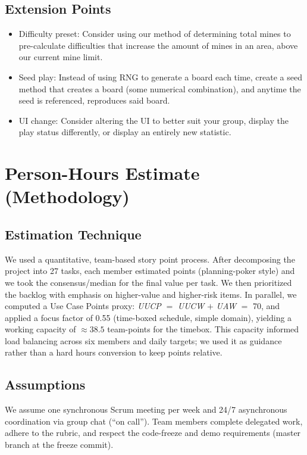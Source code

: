 \documentclass[11pt]{article}
\begin{document}
\subsection{Extension Points}
\begin{itemize}
    \item Difficulty preset: Consider using our method of determining total mines to pre-calculate difficulties that increase the amount of mines in an area, above our current mine limit.
    \item Seed play: Instead of using RNG to generate a board each time, create a seed method that creates a board (some numerical combination), and anytime the seed is referenced, reproduces said board.
    \item UI change: Consider altering the UI to better suit your group, display the play status differently, or display an entirely new statistic.
\end{itemize}

\section{Person-Hours Estimate (Methodology)}
\subsection{Estimation Technique}
We used a quantitative, team-based story point process. After decomposing the project into 27 tasks, each member estimated points (planning-poker style) and we took the consensus/median for the final value per task. We then prioritized the backlog with emphasis on higher-value and higher-risk items. In parallel, we computed a Use Case Points proxy: \textit{UUCP} \(=\) \textit{UUCW} \(+\) \textit{UAW} \(=\) 70, and applied a focus factor of 0.55 (time-boxed schedule, simple domain), yielding a working capacity of \(\approx 38.5\) team-points for the timebox. This capacity informed load balancing across six members and daily targets; we used it as guidance rather than a hard hours conversion to keep points relative.

\subsection{Assumptions}
We assume one synchronous Scrum meeting per week and 24/7 asynchronous coordination via group chat (“on call”). Team members complete delegated work, adhere to the rubric, and respect the code-freeze and demo requirements (master branch at the freeze commit).
\end{document}
